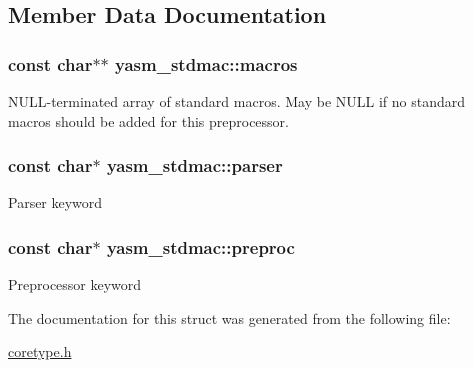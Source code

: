 \subsection{Member Data Documentation}
\hypertarget{structyasm__stdmac_a911720e695bfaf87dac4d286553eca25}{
\subsubsection[{macros}]{\setlength{\rightskip}{0pt plus 5cm}const char$\ast$$\ast$ yasm\-\_\-stdmac\-::macros}}\label{structyasm__stdmac_a911720e695bfaf87dac4d286553eca25}
N\-U\-L\-L-\/terminated array of standard macros. May be N\-U\-L\-L if no standard macros should be added for this preprocessor. \hypertarget{structyasm__stdmac_a6dd3c2173fd8ad324fc6129ecd6f669b}{
\subsubsection[{parser}]{\setlength{\rightskip}{0pt plus 5cm}const char$\ast$ yasm\-\_\-stdmac\-::parser}}\label{structyasm__stdmac_a6dd3c2173fd8ad324fc6129ecd6f669b}
Parser keyword \hypertarget{structyasm__stdmac_ad35c0b9738195cac75e8907e8475dd52}{
\subsubsection[{preproc}]{\setlength{\rightskip}{0pt plus 5cm}const char$\ast$ yasm\-\_\-stdmac\-::preproc}}\label{structyasm__stdmac_ad35c0b9738195cac75e8907e8475dd52}
Preprocessor keyword 

The documentation for this struct was generated from the following file\-:\begin{DoxyCompactItemize}
\item 
\hyperlink{coretype_8h}{coretype.\-h}\end{DoxyCompactItemize}
